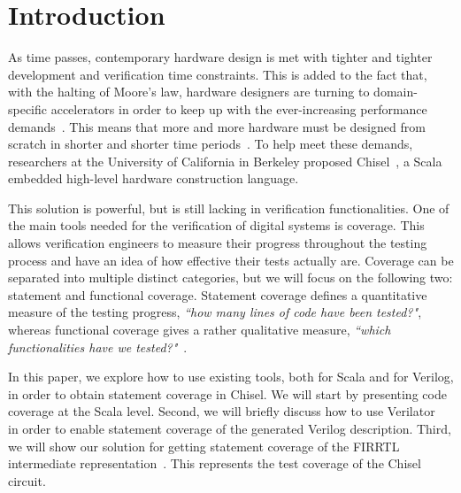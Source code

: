 \documentclass[conference]{IEEEtran}
\newcommand{\martin}[1]{{\color{blue} Martin: #1}}
\begin{document}

\section{Introduction}
\label{sec:objectives}
As time passes, contemporary hardware design is met with tighter and tighter development and verification time constraints. This is added to the fact that, with the halting of Moore's law, hardware designers are turning to domain-specific accelerators in order to keep up with the ever-increasing performance demands~\cite{henn-patt:turing:2019}. This means that more and more hardware must be designed from scratch in shorter and shorter time periods~\cite{domain-hw-acc:2020}.  To help meet these demands, researchers at the University of California in Berkeley proposed Chisel~\cite{chisel:dac2012}, a Scala embedded high-level hardware construction language.

This solution is powerful, but is still lacking in verification functionalities. One of the main tools needed for the verification of digital systems is coverage. This allows verification engineers to measure their progress throughout the testing process and have an idea of how effective their tests actually are. Coverage can be separated into multiple distinct categories, but we will focus on the following two: statement and functional coverage. Statement coverage defines a quantitative measure of the testing progress, \textit{``how many lines of code have been tested?"}, whereas functional coverage gives a rather qualitative measure, \textit{``which functionalities have we tested?"}~\cite{spear2008systemverilog}.


In this paper, we explore how to use existing tools, both for Scala and for Verilog, in order to obtain statement coverage in Chisel. We will start by presenting code coverage at the Scala level. Second, we will briefly discuss how to use Verilator~\cite{verilator} in order to enable statement coverage of the generated Verilog description. Third, we will show our solution for getting statement coverage of the FIRRTL intermediate representation~\cite{firrtl}. This represents the test coverage of the Chisel circuit.
\end{document}
